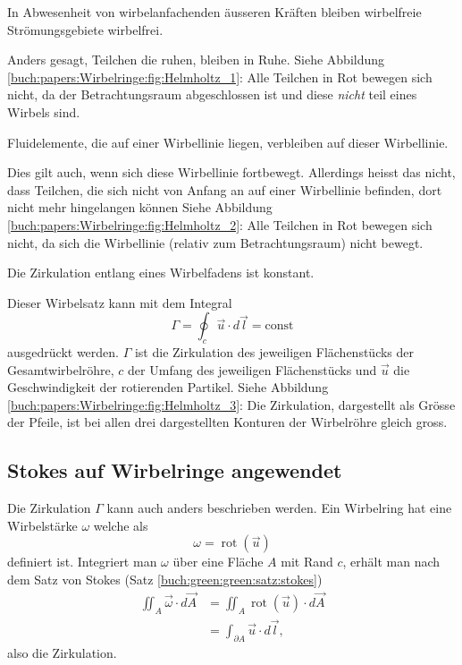 \begin{satz}
    In Abwesenheit von wirbelanfachenden äusseren Kräften bleiben wirbelfreie Strömungsgebiete wirbelfrei.
\end{satz}

Anders gesagt, Teilchen die ruhen, bleiben in Ruhe. 
Siehe Abbildung \ref{buch:papers:Wirbelringe:fig:Helmholtz_1}: 
Alle Teilchen in Rot bewegen sich nicht, da der Betrachtungsraum abgeschlossen ist und diese {\em nicht} teil eines Wirbels sind.

\begin{satz}
    Fluidelemente, die auf einer Wirbellinie liegen, verbleiben auf dieser Wirbellinie.
\end{satz}

Dies gilt auch, wenn sich diese Wirbellinie fortbewegt. 
Allerdings heisst das nicht, dass Teilchen, die sich nicht von Anfang an auf einer Wirbellinie befinden, dort nicht mehr hingelangen können
Siehe Abbildung \ref{buch:papers:Wirbelringe:fig:Helmholtz_2}:  
Alle Teilchen in Rot bewegen sich nicht, da sich die Wirbellinie (relativ zum Betrachtungsraum) nicht bewegt.

\begin{satz}
    Die Zirkulation entlang eines Wirbelfadens ist konstant. 
\end{satz}

Dieser Wirbelsatz kann mit dem Integral 
\[
\Gamma
= 
\oint_{c} \vec{u} \cdot d \vec{l}
=
\text{const}
\]
ausgedrückt werden. 
\(\Gamma\) ist die Zirkulation des jeweiligen Flächenstücks der Gesamtwirbelröhre, \(c\) der Umfang des jeweiligen Flächenstücks und \(\vec{u}\) die Geschwindigkeit der rotierenden Partikel. 
Siehe Abbildung \ref{buch:papers:Wirbelringe:fig:Helmholtz_3}: 
Die Zirkulation, dargestellt als Grösse der Pfeile, ist bei allen drei dargestellten Konturen der Wirbelröhre gleich gross.


\subsection{Stokes auf Wirbelringe angewendet \label{paper:Wirbelringe:Stokes}}

Die Zirkulation \(\Gamma\) kann auch anders beschrieben werden. 
Ein Wirbelring hat eine Wirbelstärke \(\omega\) welche als
\[
\omega
=
\operatorname{rot}\left( \vec{u} \right)
\]
definiert ist.
Integriert man $\omega$ über eine Fläche \(A\) mit Rand \(c\), erhält man nach dem Satz von Stokes (Satz \ref{buch:green:green:satz:stokes})
\begin{align*}
\iint_{A} \vec{\omega} \cdot d \vec{A}
&=
\iint_{A} \operatorname{rot}\left(\vec{u}\right)\cdot  d \vec{A}\\
&=
\int_{\partial A} \vec{u} \cdot d\vec{l},
\end{align*}
also die Zirkulation.

